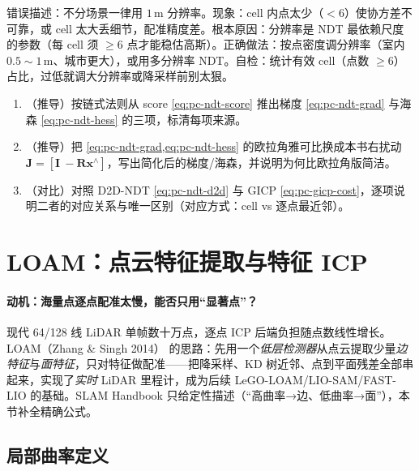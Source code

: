 \begin{pitfall}
错误描述：不分场景一律用 $1\,\mathrm{m}$ 分辨率。现象：cell 内点太少（$<6$）使协方差不可靠，或 cell 太大丢细节，配准精度差。根本原因：分辨率是 NDT 最依赖尺度的参数（每 cell 须 $\ge6$ 点才能稳估高斯）。正确做法：按点密度调分辨率（室内 $0.5\sim1\,\mathrm{m}$、城市更大），或用多分辨率 NDT。自检：统计有效 cell（点数 $\ge6$）占比，过低就调大分辨率或降采样前别太狠。
\end{pitfall}

\begin{practice}
\begin{enumerate}
  \item （推导）按链式法则从 score \cref{eq:pc-ndt-score} 推出梯度 \cref{eq:pc-ndt-grad} 与海森 \cref{eq:pc-ndt-hess} 的三项，标清每项来源。
  \item （推导）把 \cref{eq:pc-ndt-grad,eq:pc-ndt-hess} 的欧拉角雅可比换成本书右扰动 $\mathbf{J}=[\mathbf{I}\ {-}\mathbf{R}\mathbf{x}^\wedge]$，写出简化后的梯度/海森，并说明为何比欧拉角版简洁。
  \item （对比）对照 D2D-NDT \cref{eq:pc-ndt-d2d} 与 GICP \cref{eq:pc-gicp-cost}，逐项说明二者的对应关系与唯一区别（对应方式：cell vs 逐点最近邻）。
\end{enumerate}
\end{practice}

\section{LOAM：点云特征提取与特征 ICP}
\label{sec:pc-loam}

\paragraph{动机：海量点逐点配准太慢，能否只用“显著点”？}
现代 64/128 线 LiDAR 单帧数十万点，逐点 ICP 后端负担随点数线性增长。LOAM（Zhang \& Singh 2014）\cite{zhang2014loam} 的思路：先用一个\emph{低层检测器}从点云提取少量\emph{边特征}与\emph{面特征}，只对特征做配准——把降采样、KD 树近邻、点到平面残差全部串起来，实现了\emph{实时} LiDAR 里程计，成为后续 LeGO-LOAM/LIO-SAM/FAST-LIO 的基础。SLAM Handbook 只给定性描述（“高曲率→边、低曲率→面”），本节补全精确公式。

\subsection{局部曲率定义}
\label{sec:pc-loam-curv}

